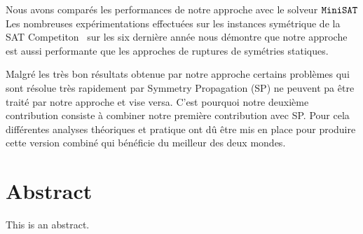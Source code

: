 Nous avons comparés les performances de notre approche avec le solveur $\texttt{MiniSAT}$
Les nombreuses expérimentations effectuées sur les instances symétrique de la SAT Competiton~\cite{jarvisalo2012international} sur les six dernière année nous démontre que notre approche est aussi performante que les approches de ruptures de symétries statiques.


Malgré les très bon résultats obtenue par notre approche certains problèmes qui sont résolue très 
rapidement par Symmetry Propagation (SP) ne peuvent pa être traité par notre approche et vise versa.
C'est pourquoi notre deuxième contribution consiste à combiner notre première contribution avec SP.
Pour cela différentes analyses théoriques et pratique ont dû être mis en place pour produire cette version
combiné qui bénéficie du meilleur des deux mondes.

\chapter*{Abstract}

This is an abstract.